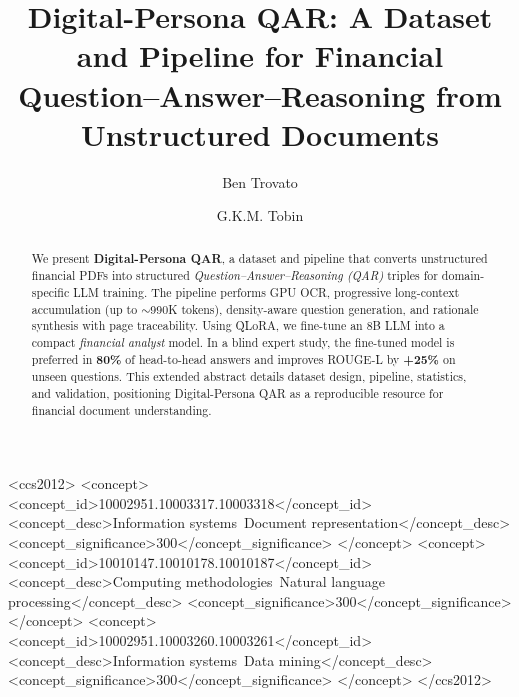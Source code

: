 \documentclass[sigconf,authordraft,anonymous]{acmart}
\begin{document}
\title{Digital-Persona QAR: A Dataset and Pipeline for Financial Question--Answer--Reasoning from Unstructured Documents}

\author{Ben Trovato}
\author{G.K.M. Tobin}
\authornotemark[1]

\renewcommand{\shortauthors}{Trovato et al.}

\begin{abstract}
    We present \textbf{Digital-Persona QAR}, a dataset and pipeline that converts unstructured financial PDFs into structured \emph{Question--Answer--Reasoning (QAR)} triples for domain-specific LLM training. The pipeline performs GPU OCR, progressive long-context accumulation (up to $\sim$990K tokens), density-aware question generation, and rationale synthesis with page traceability. Using QLoRA, we fine-tune an 8B LLM into a compact \emph{financial analyst} model. In a blind expert study, the fine-tuned model is preferred in \textbf{80\%} of head-to-head answers and improves ROUGE-L by \textbf{+25\%} on unseen questions. This extended abstract details dataset design, pipeline, statistics, and validation, positioning Digital-Persona QAR as a reproducible resource for financial document understanding.
\end{abstract}

\begin{CCSXML}
<ccs2012>
 <concept>
  <concept_id>10002951.10003317.10003318</concept_id>
  <concept_desc>Information systems~Document representation</concept_desc>
  <concept_significance>300</concept_significance>
 </concept>
 <concept>
  <concept_id>10010147.10010178.10010187</concept_id>
  <concept_desc>Computing methodologies~Natural language processing</concept_desc>
  <concept_significance>300</concept_significance>
 </concept>
 <concept>
  <concept_id>10002951.10003260.10003261</concept_id>
  <concept_desc>Information systems~Data mining</concept_desc>
  <concept_significance>300</concept_significance>
 </concept>
</ccs2012>
\end{CCSXML}
\end{document}
